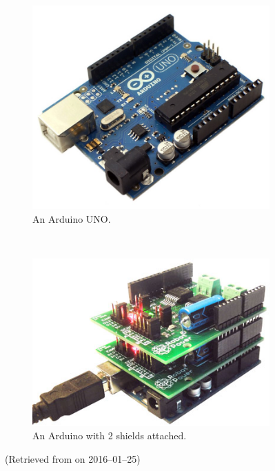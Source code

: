 

    \label{outline: control}
        \begin{figure}%
            \centering
            \begin{subfigure}[b]{0.45\textwidth}
                \includegraphics[width=\textwidth]{Files/arduino}
                \caption{An Arduino UNO.}
                \label{fig: arduino}
            \end{subfigure}
            ~
            \begin{subfigure}[b]{0.45\textwidth}
                \includegraphics[width=\textwidth]{Files/arduino_with_shields}
                \caption{An Arduino with 2 \glspl{shield} attached.}
                \label{fig: arduino shields}
            \end{subfigure}
            \caption{\small (Retrieved from  on 2016--01--25)}
            \label{fig: arduino and shields}
        \end{figure}
